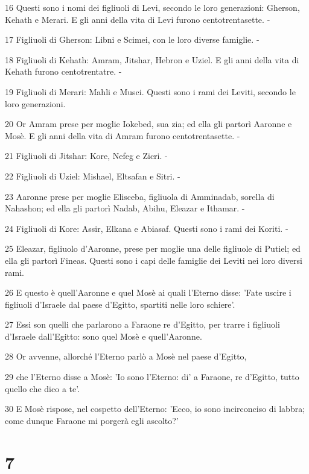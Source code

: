 \par 16 Questi sono i nomi dei figliuoli di Levi, secondo le loro generazioni: Gherson, Kehath e Merari. E gli anni della vita di Levi furono centotrentasette. -
\par 17 Figliuoli di Gherson: Libni e Scimei, con le loro diverse famiglie. -
\par 18 Figliuoli di Kehath: Amram, Jitshar, Hebron e Uziel. E gli anni della vita di Kehath furono centotrentatre. -
\par 19 Figliuoli di Merari: Mahli e Musci. Questi sono i rami dei Leviti, secondo le loro generazioni.
\par 20 Or Amram prese per moglie Iokebed, sua zia; ed ella gli partorì Aaronne e Mosè. E gli anni della vita di Amram furono centotrentasette. -
\par 21 Figliuoli di Jitshar: Kore, Nefeg e Zicri. -
\par 22 Figliuoli di Uziel: Mishael, Eltsafan e Sitri. -
\par 23 Aaronne prese per moglie Elisceba, figliuola di Amminadab, sorella di Nahashon; ed ella gli partorì Nadab, Abihu, Eleazar e Ithamar. -
\par 24 Figliuoli di Kore: Assir, Elkana e Abiasaf. Questi sono i rami dei Koriti. -
\par 25 Eleazar, figliuolo d'Aaronne, prese per moglie una delle figliuole di Putiel; ed ella gli partorì Fineas. Questi sono i capi delle famiglie dei Leviti nei loro diversi rami.
\par 26 E questo è quell'Aaronne e quel Mosè ai quali l'Eterno disse: 'Fate uscire i figliuoli d'Israele dal paese d'Egitto, spartiti nelle loro schiere'.
\par 27 Essi son quelli che parlarono a Faraone re d'Egitto, per trarre i figliuoli d'Israele dall'Egitto: sono quel Mosè e quell'Aaronne.
\par 28 Or avvenne, allorché l'Eterno parlò a Mosè nel paese d'Egitto,
\par 29 che l'Eterno disse a Mosè: 'Io sono l'Eterno: di' a Faraone, re d'Egitto, tutto quello che dico a te'.
\par 30 E Mosè rispose, nel cospetto dell'Eterno: 'Ecco, io sono incirconciso di labbra; come dunque Faraone mi porgerà egli ascolto?'

\chapter{7}

